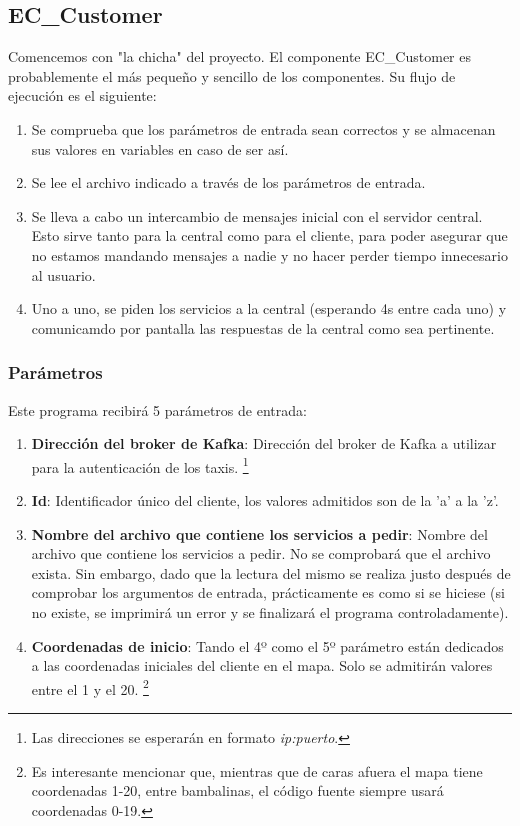 \documentclass[a4paper,12pt]{article}
\begin{document}
\subsection{EC\_Customer}
Comencemos con "la chicha" del proyecto. El componente EC\_Customer es probablemente el más pequeño y sencillo de los componentes.
Su flujo de ejecución es el siguiente:
\begin{enumerate}
  \item Se comprueba que los parámetros de entrada sean correctos y se almacenan sus valores en variables en caso de ser así.
  \item Se lee el archivo indicado a través de los parámetros de entrada.
  \item Se lleva a cabo un intercambio de mensajes inicial con el servidor central. Esto sirve tanto para la central como para el cliente,
        para poder asegurar que no estamos mandando mensajes a nadie y no hacer perder tiempo innecesario al usuario.
  \item Uno a uno, se piden los servicios a la central (esperando 4s entre cada uno) y comunicamdo por pantalla las respuestas de
        la central como sea pertinente.
\end{enumerate}
\subsubsection{Parámetros}
Este programa recibirá 5 parámetros de entrada:
\begin{enumerate}
  \item \textbf{Dirección del broker de Kafka}: Dirección del broker de Kafka a utilizar para la autenticación de los taxis.
        \footnote{Las direcciones se esperarán en formato \textit{ip:puerto}.}
  \item \textbf{Id}: Identificador único del cliente, los valores admitidos son de la 'a' a la 'z'.
  \item \textbf{Nombre del archivo que contiene los servicios a pedir}: Nombre del archivo que contiene los servicios a pedir.
        No se comprobará que el archivo exista. Sin embargo, dado que la lectura del mismo se realiza justo después de comprobar los
        argumentos de entrada, prácticamente es como si se hiciese (si no existe, se imprimirá un error y se finalizará el programa controladamente).
  \item \textbf{Coordenadas de inicio}: Tando el 4º como el 5º parámetro están dedicados a las coordenadas iniciales del cliente en el mapa.
        Solo se admitirán valores entre el 1 y el 20.
        \footnote{Es interesante mencionar que, mientras que de caras afuera el mapa tiene coordenadas 1-20, entre bambalinas, el código fuente
          siempre usará coordenadas 0-19.}
\end{enumerate}
\end{document}
